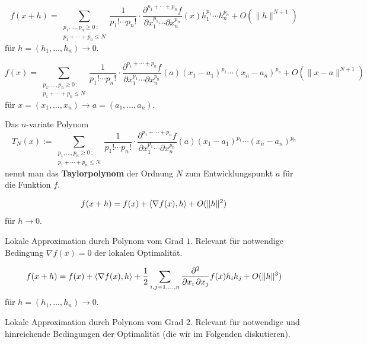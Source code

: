 \begin{bem}
	\[
		f(x+ h) =  \sum_{\substack{p_1,\ldots,p_n \ge 0 \ : \\p_1 + \cdots + p_n \le N}} \frac{1}{p_1! \cdots p_n !} \cdot \frac{\partial^{p_1+ \cdots +p_n} f}{\partial x_1^{p_1} \cdots \partial x_n^{p_n}} (x) h_1^{p_1} \cdots h_n^{p_n} + O(\|h\|^{N+1})
	\]
	für $h= (h_1,\ldots,h_n) \to 0$. 
\end{bem}

\begin{bem}
		\[
	f(x) = \sum_{\substack{p_1,\ldots,p_n \ge 0 \ :\\p_1 + \cdots + p_n \le N}} \frac{1}{p_1! \cdots p_n !} \cdot \frac{\partial^{p_1 + \cdots + p_n} f}{\partial x_1^{p_1} \cdots \partial x_n^{p_n}} (a) (x_1-a_1)^{p_1} \cdots (x_n - a_n)^{p_n} + O(\|x-a\|^{N+1})
	\]
	für $x = (x_1,\ldots,x_n) \to a = (a_1,\ldots,a_n)$.
\end{bem} 

\begin{defn}
	Das $n$-variate Polynom 
	\[
	T_N(x) := \sum_{\substack{p_1,\ldots,p_n \ge 0 \ :\\p_1 + \cdots + p_n \le N}} \frac{1}{p_1! \cdots p_n !} \cdot \frac{\partial^{p_1 + \cdots + p_n} f}{\partial x_1^{p_1} \cdots \partial x_n^{p_n}} (a) (x_1-a_1)^{p_1} \cdots (x_n - a_n)^{p_n}
	\]
	nennt man das \textbf{Taylorpolynom} der Ordnung $N$ zum Entwicklungspunkt $a$ für die Funktion $f$. 
\end{defn} 

\begin{bem} 
	\[
		f(x+ h) =f(x)+ \left< \nabla f (x) , h \right> + O(\|h\|^2)
	\]
	für $h \to 0$. 
	
	Lokale Approximation durch Polynom vom Grad $1$. Relevant für notwendige Bedingung $\nabla f(x) =0$ der lokalen Optimalität. 
\end{bem}

\begin{bem}
	\[
		f(x+h) = f(x) + \left< \nabla f (x) , h \right> + \frac{1}{2} \sum_{i,j=1,\ldots,n} \frac{\partial^2 }{\partial x_i \, \partial x_j} f (x) h_i h_j + O(\|h\|^3)
	\]	
	für $h = (h_1,\ldots,h_n) \to 0$. 
	
	Lokale Approximation durch Polynom vom Grad $2$. Relevant für notwendige und hinreichende Bedingungen der Optimalität (die wir im Folgenden diskutieren). 
\end{bem}  

